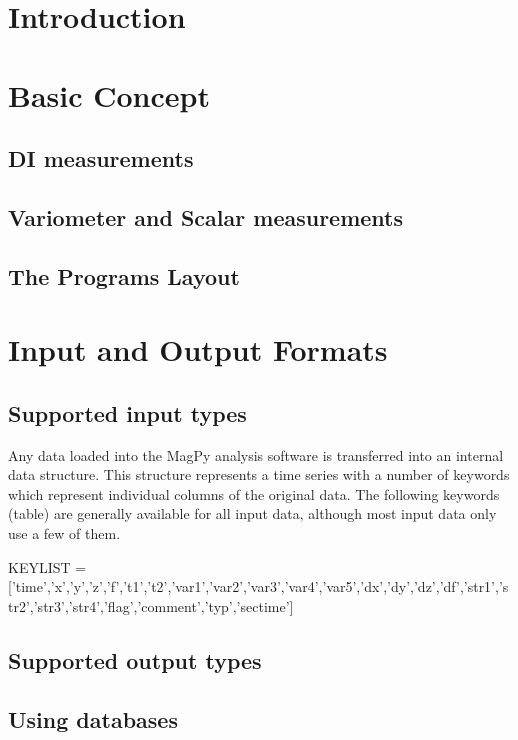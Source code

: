 \section{Introduction}


\section{Basic Concept}

\subsection{DI measurements}

\subsection{Variometer and Scalar measurements}

\subsection{The Programs Layout}


\section{Input and Output Formats}

\subsection{Supported input types}

Any data loaded into the MagPy analysis software is transferred into an internal data structure. This structure represents a time series with a number of keywords which represent individual columns of the original data. The following keywords (table) are generally available for all input data, although most input data only use a few of them.

KEYLIST = ['time','x','y','z','f','t1','t2','var1','var2','var3','var4','var5','dx','dy','dz','df','str1','str2','str3','str4','flag','comment','typ','sectime']


\subsection{Supported output types}

\subsection{Using databases}


